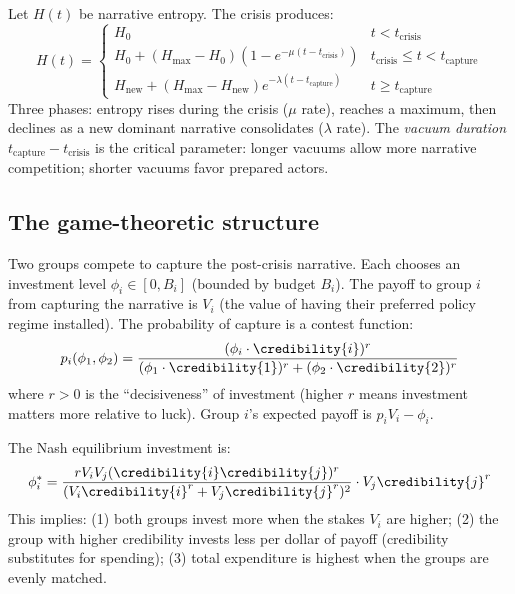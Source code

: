 \begin{model}
\label{mod:vacuum}
Let $H(t)$ be narrative entropy.
The crisis produces:
\[
  H(t) = \begin{cases}
    H_0 & t < t_{\text{crisis}} \\
    H_0 + (H_{\max} - H_0)(1 - e^{-\mu(t - t_{\text{crisis}})}) & t_{\text{crisis}} \leq t < t_{\text{capture}} \\
    H_{\text{new}} + (H_{\max} - H_{\text{new}}) e^{-\lambda(t - t_{\text{capture}})} & t \geq t_{\text{capture}}
  \end{cases}
\]
Three phases: entropy rises during the crisis ($\mu$ rate), reaches a maximum, then declines as a new dominant narrative consolidates ($\lambda$ rate).
The \emph{vacuum duration} $t_{\text{capture}} - t_{\text{crisis}}$ is the critical parameter: longer vacuums allow more narrative competition; shorter vacuums favor prepared actors.
\end{model}

\subsection{The game-theoretic structure}

\begin{model}
\label{mod:narrative-game}
Two groups compete to capture the post-crisis narrative.
Each chooses an investment level $\phi_i \in [0, B_i]$ (bounded by budget $B_i$).
The payoff to group $i$ from capturing the narrative is $V_i$ (the value of having their preferred policy regime installed).
The probability of capture is a contest function:
\[
  p_i(\phi_1, \phi_2) = \frac{(\phi_i \cdot \credibility{i})^r}{(\phi_1 \cdot \credibility{1})^r + (\phi_2 \cdot \credibility{2})^r}
\]
where $r > 0$ is the ``decisiveness'' of investment (higher $r$ means investment matters more relative to luck).
Group $i$'s expected payoff is $p_i V_i - \phi_i$.

The Nash equilibrium investment is:
\[
  \phi_i^* = \frac{r V_i V_j (\credibility{i} \credibility{j})^r}{(V_i \credibility{i}^r + V_j \credibility{j}^r)^2} \cdot V_j \credibility{j}^r
\]
This implies: (1) both groups invest more when the stakes $V_i$ are higher; (2) the group with higher credibility invests less per dollar of payoff (credibility substitutes for spending); (3) total expenditure is highest when the groups are evenly matched.
\end{model}

